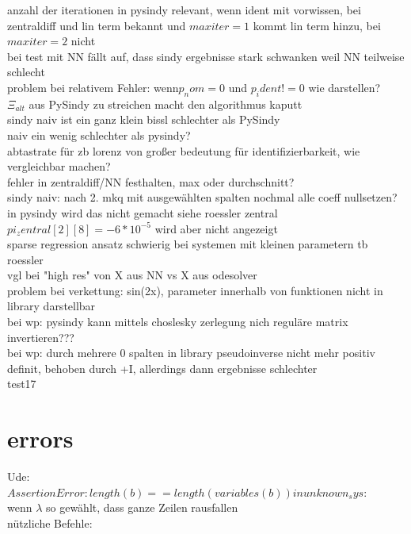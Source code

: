 \documentclass[arbeit=studie,oneside,BCOR=12mm]{ArbeitRST}
\begin{document}
anzahl der iterationen in pysindy relevant, wenn ident mit vorwissen, bei zentraldiff und lin term bekannt und $maxiter = 1$ kommt lin term hinzu, bei $maxiter = 2$ nicht\\
bei test mit NN fällt auf, dass sindy ergebnisse stark schwanken weil NN teilweise schlecht \\
problem bei relativem Fehler: wenn$ p_nom = 0$ und $p_ident != 0$ wie darstellen?\\
$\Xi_{alt}$ aus PySindy zu streichen macht den algorithmus kaputt\\
sindy naiv ist ein ganz klein bissl schlechter als PySindy\\
naiv ein wenig schlechter als pysindy?\\
abtastrate für zb lorenz von großer bedeutung für identifizierbarkeit, wie vergleichbar machen?\\
fehler in zentraldiff/NN festhalten, max oder durchschnitt?\\
sindy naiv: nach 2. mkq mit ausgewählten spalten nochmal alle coeff nullsetzen? in pysindy wird das nicht gemacht siehe roessler zentral $pi_zentral[2][8] = -6*10^{-5}$ wird aber nicht angezeigt\\
sparse regression ansatz schwierig bei systemen mit kleinen parametern tb roessler\\
vgl bei "high res" von X aus NN vs X aus odesolver\\
problem bei verkettung: sin(2x), parameter innerhalb von funktionen nicht in library darstellbar\\
bei wp: pysindy kann mittels choslesky zerlegung nich reguläre matrix invertieren???\\
bei wp: durch mehrere 0 spalten in library pseudoinverse nicht mehr positiv definit, behoben durch +I, allerdings dann ergebnisse schlechter\\
test17\\
\section{errors}
Ude:\\
$AssertionError: length(b) == length(variables(b)) in unknown_sys:$\\
wenn $\lambda$ so gewählt, dass ganze Zeilen rausfallen\\
nützliche Befehle: %

\nocite{Mik57de}

\printbibliography
\end{document}
